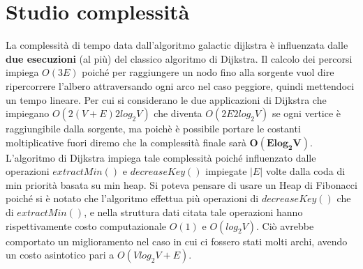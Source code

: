 \def\baselinestretch{1}
\section{Studio complessit\`a}
\def\baselinestretch{1.66}
\thispagestyle{headings}
La complessit\`a di tempo data dall'algoritmo galactic dijkstra \`e influenzata
dalle \textbf{due esecuzioni} (al pi\`u) del classico algoritmo di Dijkstra. Il calcolo
dei percorsi impiega $O(3E)$ poich\'e per raggiungere un nodo fino alla sorgente vuol dire
ripercorrere l'albero attraversando ogni arco nel caso peggiore, quindi mettendoci un tempo lineare.
Per cui si considerano le due applicazioni di Dijkstra che impiegano $O(2(V+E) 2log_2 V)$ che diventa
$O(2E2log_2 V)$ se ogni vertice \`e raggiungibile dalla sorgente, ma poich\`e è possibile portare
le costanti moltiplicative fuori diremo che la complessit\`a finale sar\`a $\mathbf{O(Elog_2V)}$.
L'algoritmo di Dijkstra impiega tale complessit\`a poich\'e influenzato dalle operazioni
$extractMin()$ e $decreaseKey()$ impiegate $|E|$ volte dalla coda di min priorit\`a basata
su min heap.
Si poteva pensare di usare un Heap di Fibonacci poich\'e si \`e notato che l'algoritmo
effettua pi\`u operazioni di $decreaseKey()$ che di $extractMin()$, e nella struttura dati
citata tale operazioni hanno rispettivamente costo computazionale $O(1)$ e $O(log_2V)$. Ci\`o
avrebbe comportato un miglioramento nel caso in cui ci fossero stati molti archi, avendo un costo
asintotico pari a $O(Vlog_2V +E)$.